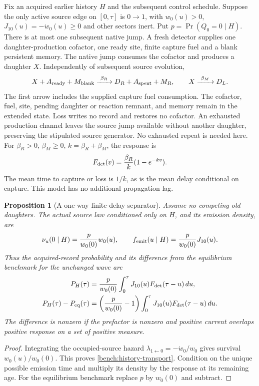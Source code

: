 \documentclass[11pt,oneside,openany]{book}
\newtheorem{proposition}[theorem]{Proposition}
\theoremstyle{definition}
\theoremstyle{remark}\newtheorem{remark}[theorem]{Remark}
\begin{document}
Fix an acquired earlier history $H$ and the subsequent control schedule.
Suppose the only active source edge on $[0,\tau]$ is $0\to1$, with
$w_0(u)>0$, $J_{10}(u)=-\dot w_0(u)\ge0$ and other sectors inert.
Put $p=\Pr(Q_0=0\mid H)$. There is at most one subsequent native jump.
A fresh detector supplies one daughter-production cofactor, one ready
site, finite capture fuel and a blank persistent memory. The native
jump consumes the cofactor and produces a daughter $X$.
Independently of subsequent source evolution,
\[
 X+A_{\rm ready}+M_{\rm blank}
 \xrightarrow{\ \beta_R\ }D_R+A_{\rm spent}+M_R,\qquad
 X\xrightarrow{\ \beta_M\ }D_L.
\]
The first arrow includes the supplied capture fuel consumption.
The cofactor, fuel, site, pending daughter or reaction remnant, and
memory remain in the extended state. Loss writes no record and
restores no cofactor. An exhausted production channel leaves the
source jump available without another daughter, preserving the
stipulated source generator. No exhausted repeat is needed here.
For $\beta_R>0$, $\beta_M\ge0$, $k=\beta_R+\beta_M$, the response is
\begin{equation}
 F_{\rm det}(v)=\frac{\beta_R}{k}(1-e^{-kv}).
 \label{bench:history-response}
\end{equation}
The mean time to capture or loss is $1/k$, as is the mean delay
conditional on capture. This model has no additional propagation lag.

\begin{proposition}[A one-way finite-delay separator]
\label{bench:history-separator}
Assume no competing old daughters. The actual source law conditioned
only on $H$, and its emission density, are
\begin{equation}
 \nu_u(0\mid H)=\frac{p}{w_0(0)}w_0(u),\qquad
 f_{\rm emit}(u\mid H)=\frac{p}{w_0(0)}J_{10}(u).
 \label{bench:history-transport}
\end{equation}
Thus the acquired-record probability and its difference from the
equilibrium benchmark for the unchanged wave are
\begin{align}
 P_H(\tau)&=\frac{p}{w_0(0)}
       \int_0^\tau J_{10}(u)F_{\rm det}(\tau-u)\,du,
       \label{bench:history-record}\\
 P_H(\tau)-P_{\rm eq}(\tau)&=
 \left(\frac{p}{w_0(0)}-1\right)
 \int_0^\tau J_{10}(u)F_{\rm det}(\tau-u)\,du.
 \label{bench:history-gap}
\end{align}
The difference is nonzero if the prefactor is nonzero and positive
current overlaps positive response on a set of positive measure.
\end{proposition}
\begin{proof}
Integrating the occupied-source hazard
$\lambda_{1\leftarrow0}=-\dot w_0/w_0$ gives survival
$w_0(u)/w_0(0)$. This proves \eqref{bench:history-transport}.
Condition on the unique possible emission time and multiply its
density by the response at its remaining age. For the equilibrium
benchmark replace $p$ by $w_0(0)$ and subtract.
\end{proof}
\end{document}
